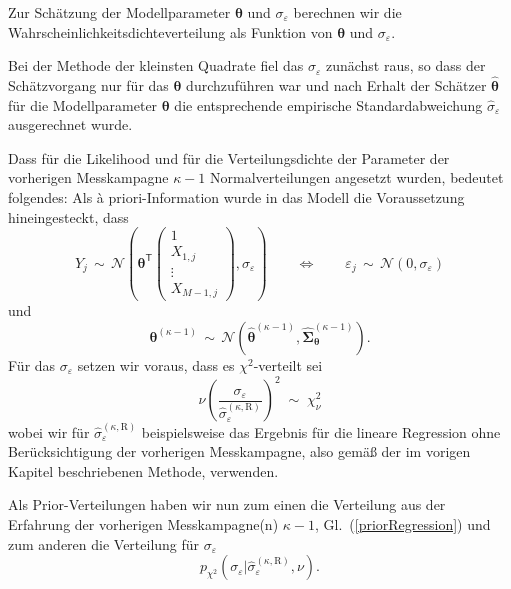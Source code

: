 Zur Schätzung der Modellparameter $\boldsymbol{\theta}$ und $\sigma_{\varepsilon}$
berechnen wir die Wahrscheinlichkeitsdichteverteilung als Funktion von
$\boldsymbol{\theta}$ und $\sigma_{\varepsilon}$.

Bei der Methode der kleinsten Quadrate fiel das $\sigma_{\varepsilon}$ zunächst raus,
so dass der Schätzvorgang nur für das $\boldsymbol{\theta}$ durchzuführen war und nach
Erhalt der Schätzer $\boldsymbol{\hat \theta}$ für die Modellparameter
$\boldsymbol{\theta}$ die entsprechende empirische Standardabweichung
$\hat \sigma_{\varepsilon}$ ausgerechnet wurde.

Dass für die Likelihood und für die Verteilungsdichte der Parameter der
vorherigen Messkampagne $\kappa-1$ Normalverteilungen angesetzt wurden, bedeutet folgendes:
Als {\`a} priori-Information wurde in das Modell die Voraussetzung hineingesteckt, dass
\begin{equation}
Y_j \, \sim \, \mathcal{N}(\boldsymbol{\theta}^\mathsf{T} \left(
\begin{array}{c} 1\\ X_{1,j}\\ \vdots \\ X_{M-1,j}\end{array}\right), \sigma_{\varepsilon})
\qquad \Leftrightarrow \qquad
\varepsilon_j \, \sim \, \mathcal{N}(0, \sigma_{\varepsilon})
\end{equation}
und
\begin{equation}
\boldsymbol{\theta}^{(\kappa-1)} \, \sim \, 
\mathcal{N}(\boldsymbol{\hat \theta}^{(\kappa-1)}, 
\boldsymbol{\hat \Sigma}_{\boldsymbol{\theta}}^{(\kappa-1)}) .
\end{equation}
Für das $\sigma_{\varepsilon}$ setzen wir voraus, dass es $\chi^2$-verteilt sei
\begin{equation}
\nu \left(\frac{\sigma_{\varepsilon}}{\hat \sigma_{\varepsilon}^{(\kappa,\mathrm{R})}}\right)^2
\; \sim \; \chi^2_{\nu}
\end{equation}
wobei wir für $\hat \sigma_{\varepsilon}^{(\kappa,\mathrm{R})}$ beispielsweise das Ergebnis
für die lineare Regression ohne Berücksichtigung der vorherigen Messkampagne, also gemäß
der im vorigen Kapitel beschriebenen Methode, verwenden.

Als Prior-Verteilungen haben wir nun zum einen die Verteilung aus der 
Erfahrung der vorherigen Messkampagne(n) $\kappa-1$, Gl.~(\ref{priorRegression})
und zum anderen die Verteilung für $\sigma_{\varepsilon}$
\begin{equation}
p_{\chi^2} (\sigma_{\varepsilon} | \hat \sigma_{\varepsilon}^{(\kappa,\mathrm{R})}, \nu) .
\label{priorSigmaEpsi}
\end{equation}

